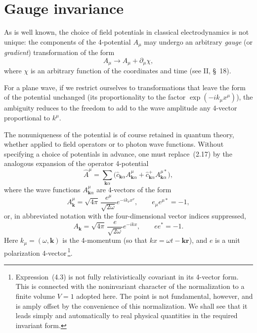 \section{Gauge invariance}

As is well known, the choice of field potentials in classical electrodynamics is not unique: the components of the 4-potential $A_\mu$ may undergo an arbitrary \emph{gauge} (or \emph{gradient}) transformation of the form
\begin{equation}
A_\mu \to A_\mu + \partial_\mu\chi,
\tag{4.1}
\end{equation}
where $\chi$ is an arbitrary function of the coordinates and time (see II, \S~18).

For a plane wave, if we restrict ourselves to transformations that leave the form of the potential unchanged (its proportionality to the factor $\exp(-ik_\mu x^\mu)$), the ambiguity reduces to the freedom to add to the wave amplitude any 4-vector proportional to $k^\mu$.

The nonuniqueness of the potential is of course retained in quantum theory, whether applied to field operators or to photon wave functions. Without specifying a choice of potentials in advance, one must replace~(2.17) by the analogous expansion of the operator 4-potential
\begin{equation}
\widehat A^\mu = \sum_{\mathbf{k}\alpha}\bigl(\widehat c_{\mathbf{k}\alpha}A^\mu_{\mathbf{k}\alpha} + \widehat c^+_{\mathbf{k}\alpha}A^{\mu*}_{\mathbf{k}\alpha}\bigr),
\tag{4.2}
\end{equation}
where the wave functions $A^\mu_{\mathbf{k}\alpha}$ are 4-vectors of the form
\[
A^\mu_{\mathbf{k}} = \sqrt{4\pi}\,\frac{e^\mu}{\sqrt{2\omega}}e^{-ik_\nu x^\nu},
\qquad e_\mu e^{\mu*} = -1,
\]
or, in abbreviated notation with the four-dimensional vector indices suppressed,
\begin{equation}
A_{\mathbf{k}} = \sqrt{4\pi}\,\frac{e}{\sqrt{2\omega}}e^{-ikx},
\qquad ee^* = -1.
\tag{4.3}
\end{equation}
Here $k_\mu = (\omega,\mathbf{k})$ is the 4-momentum (so that $kx = \omega t - \mathbf{kr}$), and $e$ is a unit polarization 4-vector\,\footnote{Expression~(4.3) is not fully relativistically covariant in its 4-vector form. This is connected with the noninvariant character of the normalization to a finite volume $V = 1$ adopted here. The point is not fundamental, however, and is amply offset by the convenience of this normalization. We shall see that it leads simply and automatically to real physical quantities in the required invariant form.}.

